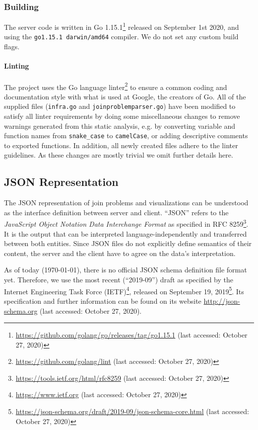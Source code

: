 \subsubsection{Building}

The server code is written in Go 1.15.1\footnote{\url{https://github.com/golang/go/releases/tag/go1.15.1} (last accessed: October 27, 2020)} released on September 1st 2020, and using the \texttt{go1.15.1 darwin/amd64} compiler. We do not set any custom build flags.

\paragraph{Linting} The project uses the Go language linter\footnote{\url{https://github.com/golang/lint} (last accessed: October 27, 2020)} to ensure a common coding and documentation style with what is used at Google, the creators of Go.
All of the supplied files (\texttt{infra.go} and \texttt{joinproblemparser.go}) have been modified to satisfy all linter requirements by doing some miscellaneous changes to remove warnings generated from this static analysis, e.g. by converting variable and function names from \texttt{snake\_case} to \texttt{camelCase}, or adding descriptive comments to exported functions. In addition, all newly created files adhere to the linter guidelines. As these changes are mostly trivial we omit further details here. 

\subsection{JSON Representation}
\label{sub:json-representation}

The JSON representation of join problems and visualizations can be understood as the interface definition between server and client. 
``JSON'' refers to the \textit{JavaScript Object Notation Data Interchange Format} as specified in RFC 8259\footnote{\url{https://tools.ietf.org/html/rfc8259} (last accessed: October 27, 2020)}.
It is the output that can be interpreted language-independently and transferred between both entities. Since JSON files do not explicitly define semantics of their content, the server and the client have to agree on the data's interpretation.

As of today (\today), there is no official JSON schema definition file format yet. Therefore, we use the most recent (``2019-09'') draft as specified by the Internet Engineering Task Force (IETF)\footnote{\url{https://www.ietf.org} (last accessed: October 27, 2020)}, released on September 19, 2019\footnote{\url{https://json-schema.org/draft/2019-09/json-schema-core.html} (last accessed: October 27, 2020)}. Its specification and further information can be found on its website \url{http://json-schema.org} (last accessed: October 27, 2020).

